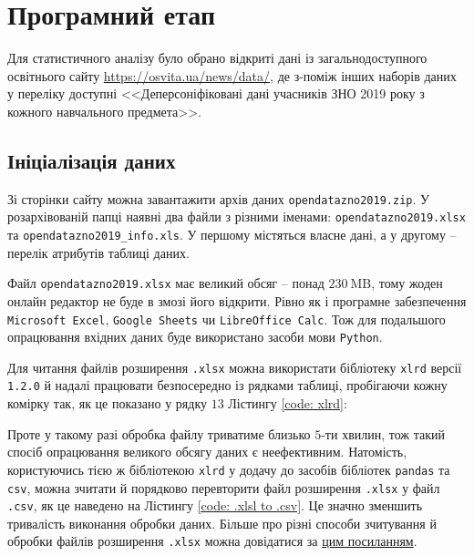 \section*{Програмний етап}

Для статистичного аналізу було обрано відкриті дані із загальнодоступного освітнього сайту 
\url{https://osvita.ua/news/data/}, де з-поміж інших наборів даних у переліку доступні 
<<Деперсоніфіковані дані учасників ЗНО 2019 року з кожного навчального предмета>>.

\subsection*{Ініціалізація даних}

Зі сторінки сайту можна завантажити архів даних \texttt{opendatazno2019.zip}. У роз\-архівованій папці 
наявні два файли з різними іменами: \texttt{opendatazno2019.xlsx} та \texttt{opendatazno2019\_info.xls}. 
У першому містяться власне дані, а у другому -- перелік атрибутів таблиці даних.  

Файл \texttt{opendatazno2019.xlsx} має великий обсяг -- понад $230\ \text{MB}$, тому жоден онлайн редактор не 
буде в змозі його відкрити. Рівно як і програмне забезпечення \texttt{Microsoft Excel}, \texttt{Google Sheets} 
чи \texttt{LibreOffice Calc}. Тож для подальшого опрацювання вхідних даних буде використано засоби мови \texttt{Python}. 

Для читання файлів розширення \texttt{.xlsx} можна використати бібліотеку \texttt{xlrd} версії \texttt{1.2.0} 
й надалі працювати безпосередно із рядками таблиці, пробігаючи кожну комірку так, як це показано у рядку $13$ 
Лістингу  \ref{code: xlrd}: 



\vspace{0.4cm}
Проте у такому разі обробка файлу триватиме близько $5$-ти хвилин, тож такий спосіб опрацювання великого 
обсягу даних є неефективним. Натомість, користуючись тією ж бібліотекою \texttt{xlrd} у додачу до засобів 
бібліотек \texttt{pandas} та \texttt{csv}, можна зчитати й порядково перевторити файл розширення \texttt{.xlsx} 
у файл \texttt{.csv}, як це наведено на Лістингу \ref{code: .xlsl to .csv}. Це значно зменшить тривалість 
виконання обробки даних. Більше про різні способи зчитування й обробки файлів розширення \texttt{.xlsx} можна 
довідатися за \href{https://linuxhint.com/read-excel-file-python/}{цим посиланням}.

